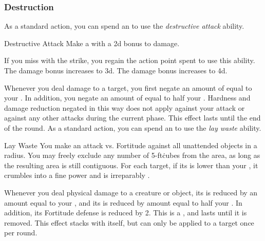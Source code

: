         \subsubsection{Destruction}
             As a standard action, you can spend an  to use the \textit{destructive attack} ability.
            \begin{ability}{Destructive Attack}
                Make a  with a \plus2d bonus to damage.

                \rankline
                 If you miss with the strike, you regain the action point spent to use this ability.
                 The damage bonus increases to \plus3d.
                 The damage bonus increases to \plus4d.
            \end{ability}
             Whenever you deal damage to a target, you first negate an amount of  equal to your .
            In addition, you negate an amount of  equal to half your .
            Hardness and damage reduction negated in this way does not apply against your attack or against any other attacks during the current phase.
            This effect lasts until the end of the round.
             As a standard action, you can spend an  to use the \textit{lay waste} ability.
            \begin{ability}{Lay Waste}
                You make an attack vs. Fortitude against all unattended objects in a \arealarge radius.
                You may freely exclude any number of 5-ft\. cubes from the area, as long as the resulting area is still contiguous.
                \hit For each target, if its  is lower than your , it crumbles into a fine power and is irreparably .
            \end{ability}
             Whenever you deal physical damage to a creature or object, its  is reduced by an amount equal to your , and its  is reduced by amount equal to half your .
            In addition, its Fortitude defense is reduced by 2.
            This is a , and lasts until it is removed.
            This effect stacks with itself, but can only be applied to a target once per round.

